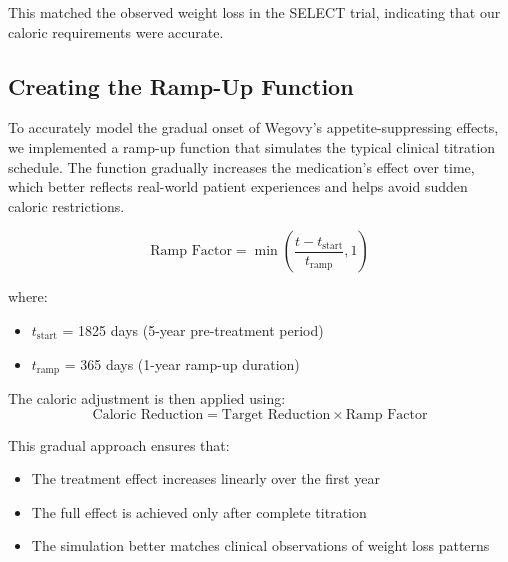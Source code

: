 This matched the observed weight loss in the SELECT trial, indicating that our caloric requirements were accurate.

\subsection{Creating the Ramp-Up Function}
To accurately model the gradual onset of Wegovy's appetite-suppressing effects, we implemented a ramp-up function that simulates the typical clinical titration schedule. The function gradually increases the medication's effect over time, which better reflects real-world patient experiences and helps avoid sudden caloric restrictions.

\begin{equation}
    \text{Ramp Factor} = \min\left(\frac{t - t_{\text{start}}}{t_{\text{ramp}}}, 1\right)
\end{equation}

where:
\begin{itemize}
    \item $t_{\text{start}}$ = 1825 days (5-year pre-treatment period)
    \item $t_{\text{ramp}}$ = 365 days (1-year ramp-up duration)
\end{itemize}

The caloric adjustment is then applied using:
\begin{equation}
    \text{Caloric Reduction} = \text{Target Reduction} \times \text{Ramp Factor}
\end{equation}

This gradual approach ensures that:
\begin{itemize}
    \item The treatment effect increases linearly over the first year
    \item The full effect is achieved only after complete titration
    \item The simulation better matches clinical observations of weight loss patterns
\end{itemize}


